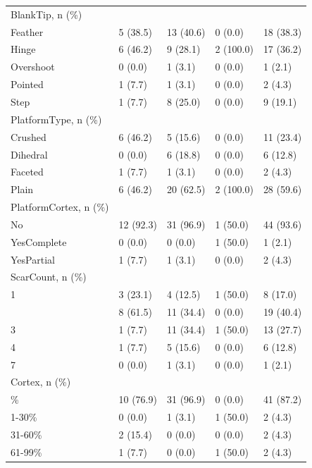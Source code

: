 \documentclass[12pt,twoside]{reedthesis}
\begin{document}
\begin{longtable}[t]{lllll}
BlankTip, n (\%) &  &  &  & \\
Feather & 5 (38.5) & 13 (40.6) & 0 (0.0) & 18 (38.3)\\
\addlinespace
Hinge & 6 (46.2) & 9 (28.1) & 2 (100.0) & 17 (36.2)\\
Overshoot & 0 (0.0) & 1 (3.1) & 0 (0.0) & 1 (2.1)\\
Pointed & 1 (7.7) & 1 (3.1) & 0 (0.0) & 2 (4.3)\\
Step & 1 (7.7) & 8 (25.0) & 0 (0.0) & 9 (19.1)\\
PlatformType, n (\%) &  &  &  & \\
\addlinespace
Crushed & 6 (46.2) & 5 (15.6) & 0 (0.0) & 11 (23.4)\\
Dihedral & 0 (0.0) & 6 (18.8) & 0 (0.0) & 6 (12.8)\\
Faceted & 1 (7.7) & 1 (3.1) & 0 (0.0) & 2 (4.3)\\
Plain & 6 (46.2) & 20 (62.5) & 2 (100.0) & 28 (59.6)\\
PlatformCortex, n (\%) &  &  &  & \\
\addlinespace
No & 12 (92.3) & 31 (96.9) & 1 (50.0) & 44 (93.6)\\
YesComplete & 0 (0.0) & 0 (0.0) & 1 (50.0) & 1 (2.1)\\
YesPartial & 1 (7.7) & 1 (3.1) & 0 (0.0) & 2 (4.3)\\
ScarCount, n (\%) &  &  &  & \\
1 & 3 (23.1) & 4 (12.5) & 1 (50.0) & 8 (17.0)\\
\addlinespace
2 & 8 (61.5) & 11 (34.4) & 0 (0.0) & 19 (40.4)\\
3 & 1 (7.7) & 11 (34.4) & 1 (50.0) & 13 (27.7)\\
4 & 1 (7.7) & 5 (15.6) & 0 (0.0) & 6 (12.8)\\
7 & 0 (0.0) & 1 (3.1) & 0 (0.0) & 1 (2.1)\\
Cortex, n (\%) &  &  &  & \\
\addlinespace
0\% & 10 (76.9) & 31 (96.9) & 0 (0.0) & 41 (87.2)\\
1-30\% & 0 (0.0) & 1 (3.1) & 1 (50.0) & 2 (4.3)\\
31-60\% & 2 (15.4) & 0 (0.0) & 0 (0.0) & 2 (4.3)\\
61-99\% & 1 (7.7) & 0 (0.0) & 1 (50.0) & 2 (4.3)\\*
\end{longtable}
\endgroup{}
\end{document}
